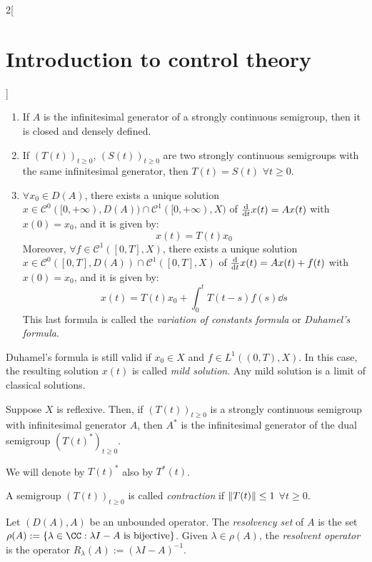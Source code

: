 \documentclass[../../../main_math.tex]{subfiles}
\begin{document}
\begin{multicols}{2}[\section{Introduction to control theory}]
\begin{proposition}
\begin{enumerate}
    \end{enumerate}
  \end{proposition}
  \begin{theorem}\hfill
    \begin{enumerate}
      \item If $A$ is the infinitesimal generator of a strongly continuous semigroup, then it is closed and densely defined.
      \item If $(T(t))_{t\geq 0}$, $(S(t))_{t\geq 0}$ are two strongly continuous semigroups with the same infinitesimal generator, then $T(t)=S(t)$ $\forall t\geq 0$.
      \item $\forall x_0\in D(A)$, there exists a unique solution $x\in \mathcal{C}^0([0,+\infty),D(A))\cap \mathcal{C}^1([0,+\infty),X)$ of $\dv{}{t}x(t)=Ax(t)$ with $x(0)=x_0$, and it is given by: $$x(t)=T(t)x_0$$
            Moreover, $\forall f\in \mathcal{C}^1([0,T],X)$, there exists a unique solution $x\in \mathcal{C}^0([0,T],D(A))\cap \mathcal{C}^1([0,T],X)$ of $\dv{}{t}x(t)=Ax(t)+f(t)$ with $x(0)=x_0$, and it is given by: $$
              x(t)=T(t)x_0+\int_0^t T(t-s)f(s)\dd s
            $$
            This last formula is called the \emph{variation of constants formula} or \emph{Duhamel's formula}.
    \end{enumerate}
  \end{theorem}
  \begin{remark}
    Duhamel's formula is still valid if $x_0\in X$ and $f\in L^1((0,T),X)$. In this case, the resulting solution $x(t)$ is called \emph{mild solution}. Any mild solution is a limit of classical solutions.
  \end{remark}
  \begin{theorem}
    Suppose $X$ is reflexive. Then, if $(T(t))_{t\geq 0}$ is a strongly continuous semigroup with infinitesimal generator $A$, then $A^*$ is the infinitesimal generator of the dual semigroup $(T(t)^*)_{t\geq 0}$.
  \end{theorem}
  \begin{remark}
    We will denote by $T(t)^*$ also by $T^*(t)$.
  \end{remark}
  \begin{definition}
    A semigroup $(T(t))_{t\geq 0}$ is called \emph{contraction} if $\norm{T(t)}\leq 1$ $\forall t\geq 0$.
  \end{definition}
  \begin{definition}
    Let $(D(A),A)$ be an unbounded operator. The \emph{resolvency set} of $A$ is the set $\rho(A):=\{ \lambda\in \CC:\lambda I-A\text{ is bijective}\}$. Given $\lambda\in\rho(A)$, the \emph{resolvent operator} is the operator $R_\lambda(A):=(\lambda I-A)^{-1}$.

\end{definition}
\end{multicols}
\end{document}
